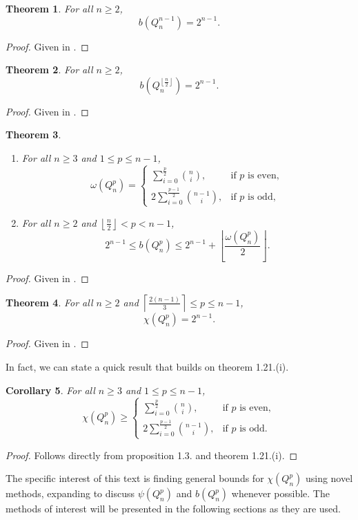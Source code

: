 \documentclass[12pt]{amsart}
\numberwithin{figure}{section}
\theoremstyle{plain}
\newtheorem{theorem}{Theorem}[section]
\newtheorem{corollary}[theorem]{Corollary}
\begin{document}
\begin{theorem}
    For all $n\geq 2$,
    \[b(Q_{n}^{n-1}) = 2^{n-1}.\]
\end{theorem}
\begin{proof}
    Given in \cite{Francis17}.
\end{proof}
\begin{theorem}
    For all $n\geq 2$,
    \[b(Q_{n}^{\left\lfloor\frac{n}{2}\right\rfloor}) = 2^{n-1}.\]
\end{theorem}
\begin{proof}
    Given in \cite{Francis17}.
\end{proof}
\begin{theorem}\normalfont
\begin{enumerate}[label=(\roman*)]
    \item\textit{ For all $n \geq 3$ and $1 \leq p \leq n-1$,
    \[
        \omega(Q_{n}^{p}) =
        \begin{cases}
            \sum_{i=0}^{\frac{p}{2}}\binom{n}{i}, & \text{if } p \text{ is even},\\[6pt]
             2\sum_{i=0}^{\frac{p-1}{2}}\binom{n-1}{i}, & \text{if } p \text{ is odd,}
        \end{cases}
    \]}
    \item\textit{ For all $n \geq 2$ and $\left\lfloor \frac{n}{2}\right\rfloor < p < n-1$,
    \[
        2^{n-1} \leq b(Q_{n}^{p}) \leq 2^{n-1} + \left\lfloor \frac{\omega(Q_{n}^{p})}{2}\right\rfloor.
    \]}
\end{enumerate}
\end{theorem}
\begin{proof}
    Given in \cite{Francis17}.
\end{proof}
\begin{theorem}
    For all $n\geq 2$ and $\left\lceil\frac{2(n-1)}{3}\right\rceil \leq p \leq n-1$,
    \[\chi(Q_{n}^{p}) = 2^{n-1}.\]
\end{theorem}
\begin{proof}
    Given in \cite{Francis17}.
\end{proof}
\indent In fact, we can state a quick result that builds on theorem 1.21.(i).
\begin{corollary}
    For all $n\geq 3$ and $1\leq p \leq n-1$,
    \[\chi(Q_{n}^{p}) \geq 
    \begin{cases}
        \sum_{i=0}^{\frac{p}{2}}\binom{n}{i}, & \text{if } p \text{ is even},\\[6pt]
             2\sum_{i=0}^{\frac{p-1}{2}}\binom{n-1}{i}, & \text{if } p \text{ is odd.}
    \end{cases}\]
\end{corollary}
\begin{proof}
    Follows directly from proposition 1.3. and theorem 1.21.(i).
\end{proof}
\indent The specific interest of this text is finding general bounds for $\chi(Q_{n}^{p})$ using novel methods, expanding to discuss $\psi(Q_{n}^{p})$ and $b(Q_{n}^{p})$ whenever possible. The methods of interest will be presented in the following sections as they are used.
\end{document}
